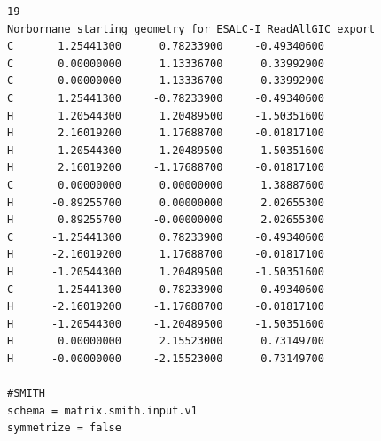 \documentclass[10pt]{article}
\begin{document}
\begin{lstlisting}[basicstyle=\ttfamily\scriptsize,caption={Complete norbornane construction input.}]
19
Norbornane starting geometry for ESALC-I ReadAllGIC export
C       1.25441300      0.78233900     -0.49340600
C       0.00000000      1.13336700      0.33992900
C      -0.00000000     -1.13336700      0.33992900
C       1.25441300     -0.78233900     -0.49340600
H       1.20544300      1.20489500     -1.50351600
H       2.16019200      1.17688700     -0.01817100
H       1.20544300     -1.20489500     -1.50351600
H       2.16019200     -1.17688700     -0.01817100
C       0.00000000      0.00000000      1.38887600
H      -0.89255700      0.00000000      2.02655300
H       0.89255700     -0.00000000      2.02655300
C      -1.25441300      0.78233900     -0.49340600
H      -2.16019200      1.17688700     -0.01817100
H      -1.20544300      1.20489500     -1.50351600
C      -1.25441300     -0.78233900     -0.49340600
H      -2.16019200     -1.17688700     -0.01817100
H      -1.20544300     -1.20489500     -1.50351600
H       0.00000000      2.15523000      0.73149700
H      -0.00000000     -2.15523000      0.73149700

#SMITH
schema = matrix.smith.input.v1
symmetrize = false
\end{lstlisting}
\end{document}
